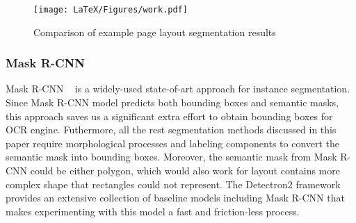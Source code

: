 \documentclass[letterpaper]{article} %
\begin{document}



\begin{figure}[h]
   \centering
   \texttt{[image: LaTeX/Figures/work.pdf]}
   \caption{Comparison of example page layout segmentation results}
   \label{fig:all_vis}
 \end{figure}

\subsubsection{Mask R-CNN}
Mask R-CNN ~\cite{DBLP:conf/iccv/HeGDG17} is a widely-used state-of-art approach for instance segmentation. Since Mask R-CNN model predicts both bounding boxes and semantic masks, this approach saves us a significant extra effort to obtain bounding boxes for OCR engine. Futhermore, all the rest segmentation methods discussed in this paper require morphological processes and labeling components to convert the semantic mask into bounding boxes. Moreover, the semantic mask from Mask R-CNN could be either polygon, which would also work for layout contains more complex shape that rectangles could not represent.
The Detectron2 framework ~\cite{wu2019detectron2} provides an extensive collection of baseline models including Mask R-CNN that makes experimenting with this model a fast and friction-less process.
\end{document}
